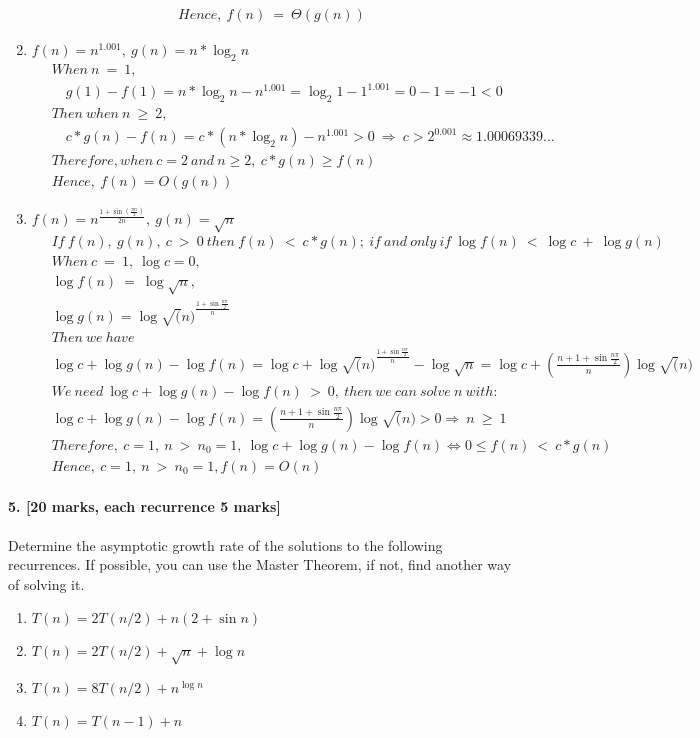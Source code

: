 \documentclass[a4paper]{scrartcl}
\begin{document}
\begin{enumerate}[label=(\alph*)]
\begin{align*}
  Hence,\ f(n)\ =\ \Theta(g(n))
  \end{align*}
  \item $f(n)=n^{1.001},\ g(n)=n*\log_2{n}$
  \begin{align*}
  &\ When\ n\ =\ 1,\\ &\ \quad g(1)-f(1)=n*\log_2{n}-n^{1.001}=\log_2{1}-1^{1.001}=0-1=-1<0 \\&\
  Then\ when\ n\ \geq\ 2, \\ &\ \quad
  c*g(n)-f(n)= c*(n*\log_2{n})-n^{1.001}>0\ \Rightarrow\ c > 2^{0.001} \approx 1.00069339...\\&\
  Therefore, when\ c=2\ and\ n \geq 2,\ c*g(n) \geq f(n)\\&\
  Hence,\ f(n) = O(g(n)) 
  \end{align*}
  \item $f(n)=n^{\frac{1+\sin(\frac{\pi n}{2})}{2n}},\ g(n)=\sqrt{n}$
  \begin{align*}
  &\ If\ f(n),\ g(n),\ c\ >\ 0\ then\ f(n)\ <\ c*g(n);\ if\ and\ only\ if\ \log{f(n)}\ <\ \log{c}\ +\ \log{g(n)}\\&\
  When\ c\ =\ 1,\ \log{c} = 0,\\&\ 
  \log{f(n)}\ =\ \log{\sqrt{n}},\\&\ \log{g(n)}=\log{\sqrt(n)}^{\frac{1+\sin{\frac{n\pi}{2}}}{n}}\\&\ 
  Then\ we\ have\\&\
  \log{c}+\log{g(n)}-\log{f(n)}=\log{c}+\log{\sqrt(n)}^{\frac{1+\sin{\frac{n\pi}{2}}}{n}}-\log{\sqrt{n}}=\log{c}+(\frac{n+1+\sin{\frac{n\pi}{2}}}{n})\log{\sqrt(n)}\\&\
  We\ need\ \log{c}+\log{g(n)}-\log{f(n)}\ >\ 0,\ then\ we\ can\ solve\ n\ with:\\ &\
  \log{c}+\log{g(n)}-\log{f(n)}=(\frac{n+1+\sin{\frac{n\pi}{2}}}{n})\log{\sqrt(n)}>0\Rightarrow\ n\ \geq\ 1 \\&\
  Therefore,\ c=1,\ n\ >\ n_0=1,\ \log{c}+\log{g(n)}-\log{f(n)} \iff 0 \leq f(n)\ <\ c*g(n)\\&\
  Hence, \ c=1,\ n\ >\ n_0=1, f(n)=O(n) 
  \end{align*}
\end{enumerate}
\paragraph{5. [20 marks, each recurrence 5 marks]}
\label{sec:Question 5}
Determine the asymptotic growth rate of the solutions to the following recurrences. If possible, you can use the Master Theorem, if not, find another way of solving it.
\begin{enumerate}[label=(\alph*)]
  \item $T (n) = 2T (n/2) + n(2 + \sin{n})$
  \item $T (n) = 2T (n/2) + \sqrt{n} + \log{n}$
  \item $T (n) = 8T (n/2) + n^{\log{n}}$
  \item $T (n) = T (n − 1) + n$
\end{enumerate}
\end{document}
